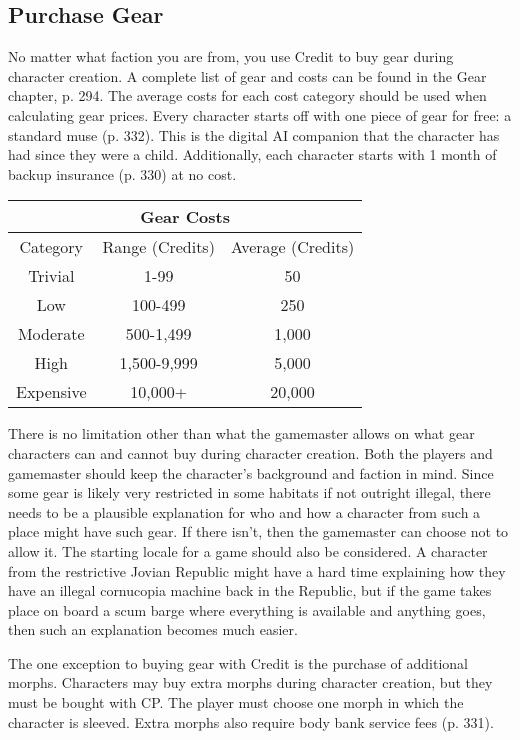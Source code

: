 \subsection{Purchase Gear}
\label{sec:purchase-gear}

No matter what faction you are from, you use Credit to buy gear during character creation. A complete list of gear and costs can be found in the Gear chapter, p. 294. The average costs for each cost category should be used when calculating gear prices.     Every character starts off with one piece of gear for free: a standard muse (p. 332). This is the digital AI companion that the character has had since they were a child. Additionally, each character starts with 1 month of backup insurance (p. 330) at no cost.

\begin{center} 
\begin{tabular}{|c|c|c|}
\hline
\multicolumn{3}{|c|}{Gear Costs} \\
\hline
Category & Range (Credits) & Average (Credits)\\
\hline
Trivial & 1-99 & 50\\
\hline
Low & 100-499 & 250\\
\hline
Moderate & 500-1,499 & 1,000\\
\hline
High & 1,500-9,999 & 5,000\\
\hline
Expensive & 10,000+ & 20,000\\
\hline 
\end{tabular}
\end{center}

There is no limitation other than what the gamemaster allows on what gear characters can and cannot buy during character creation. Both the players and gamemaster should keep the character’s background and faction in mind. Since some gear is likely very restricted in some habitats if not outright illegal, there needs to be a plausible explanation for who and how a character from such a place might have such gear. If there isn’t, then the gamemaster can choose not to allow it. The starting locale for a game should also be considered. A character from the restrictive Jovian Republic might have a hard time explaining how they have an illegal cornucopia machine back in the Republic, but if the game takes place on board a scum barge where everything is available and anything goes, then such an explanation becomes much easier.

The one exception to buying gear with Credit is the purchase of additional morphs. Characters may buy extra morphs during character creation, but they must be bought with CP. The player must choose one morph in which the character is sleeved. Extra morphs also require body bank service fees (p. 331).

